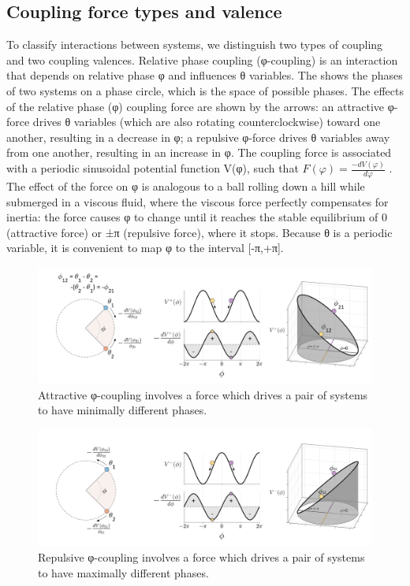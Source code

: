 \subsection{Coupling force types and valence} 

To classify interactions between systems, we distinguish two types of coupling and two coupling valences. Relative phase coupling (φ-coupling) is an interaction that depends on relative phase φ and influences θ variables. The {\figurebelow} shows the phases of two systems on a phase circle, which is the space of possible phases. The effects of the relative phase (φ) coupling force are shown by the arrows: an attractive φ-force drives θ variables (which are also rotating counterclockwise) toward one another, resulting in a decrease in φ; a repulsive φ-force drives θ variables away from one another, resulting in an increase in φ. The coupling force is associated with a periodic sinusoidal potential function V(φ), such that  $F\left(\varphi \right)=\frac{-{dV}\left(\varphi \right)}{{d\varphi} }$ . The effect of the force on φ is analogous to a ball rolling down a hill while submerged in a viscous fluid, where the viscous force perfectly compensates for inertia: the force causes φ to change until it reaches the stable equilibrium of 0 (attractive force) or ±π (repulsive force), where it stops. Because θ is a periodic variable, it is convenient to map φ to the interval [-π,+π]. 

  
\begin{figure}
\includegraphics[width=\textwidth]{figures/Tilsen-img18.png}
\caption{Attractive φ-coupling involves a force which drives a pair of systems to have minimally different phases.}
\label{fig:2:11}
\end{figure}
 

  
\begin{figure}
\includegraphics[width=\textwidth]{figures/Tilsen-img19.png}
\caption{Repulsive φ-coupling involves a force which drives a pair of systems to have maximally different phases.}
\label{fig:2:12}
\end{figure}
 

